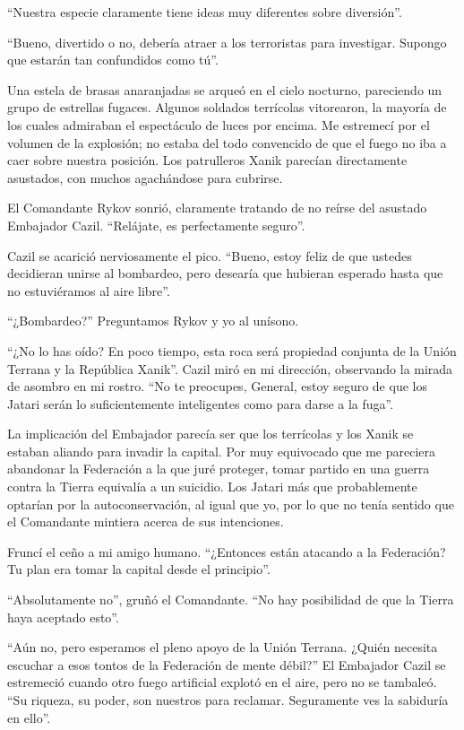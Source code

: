\documentclass[spanish,12pt,a4paper,oneside,titlepage]{book}
\begin{document}
    ``Nuestra especie claramente tiene ideas muy diferentes sobre diversión''.

    ``Bueno, divertido o no, debería atraer a los terroristas para investigar. Supongo que estarán tan confundidos como tú''.

    Una estela de brasas anaranjadas se arqueó en el cielo nocturno, pareciendo un grupo de estrellas fugaces. Algunos soldados terrícolas vitorearon, la mayoría de los cuales admiraban el espectáculo de luces por encima. Me estremecí por el volumen de la explosión; no estaba del todo convencido de que el fuego no iba a caer sobre nuestra posición. Los patrulleros Xanik parecían directamente asustados, con muchos agachándose para cubrirse.

    El Comandante Rykov sonrió, claramente tratando de no reírse del asustado Embajador Cazil. ``Relájate, es perfectamente seguro''.

    Cazil se acarició nerviosamente el pico. ``Bueno, estoy feliz de que ustedes decidieran unirse al bombardeo, pero desearía que hubieran esperado hasta que no estuviéramos al aire libre''.

    ``¿Bombardeo?'' Preguntamos Rykov y yo al unísono.

    ``¿No lo has oído? En poco tiempo, esta roca será propiedad conjunta de la Unión Terrana y la República Xanik''. Cazil miró en mi dirección, observando la mirada de asombro en mi rostro. ``No te preocupes, General, estoy seguro de que los Jatari serán lo suficientemente inteligentes como para darse a la fuga''.

    La implicación del Embajador parecía ser que los terrícolas y los Xanik se estaban aliando para invadir la capital. Por muy equivocado que me pareciera abandonar la Federación a la que juré proteger, tomar partido en una guerra contra la Tierra equivalía a un suicidio. Los Jatari más que probablemente optarían por la autoconservación, al igual que yo, por lo que no tenía sentido que el Comandante mintiera acerca de sus intenciones.

    Fruncí el ceño a mi amigo humano. ``¿Entonces están atacando a la Federación? Tu plan era tomar la capital desde el principio''.

    ``Absolutamente no'', gruñó el Comandante. ``No hay posibilidad de que la Tierra haya aceptado esto''.

    ``Aún no, pero esperamos el pleno apoyo de la Unión Terrana. ¿Quién necesita escuchar a esos tontos de la Federación de mente débil?'' El Embajador Cazil se estremeció cuando otro fuego artificial explotó en el aire, pero no se tambaleó. ``Su riqueza, su poder, son nuestros para reclamar. Seguramente ves la sabiduría en ello''.
\end{document}
